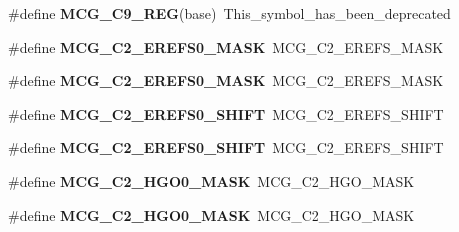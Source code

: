 \begin{DoxyCompactItemize}
\item 
\#define {\bfseries M\+C\+G\+\_\+\+C9\+\_\+\+R\+EG}(base)~This\+\_\+symbol\+\_\+has\+\_\+been\+\_\+deprecated\hypertarget{group__Backward__Compatibility__Symbols_ga4edaa0cc446f810f9aa01a41f6960573}{}\label{group__Backward__Compatibility__Symbols_ga4edaa0cc446f810f9aa01a41f6960573}

\item 
\#define {\bfseries M\+C\+G\+\_\+\+C2\+\_\+\+E\+R\+E\+F\+S0\+\_\+\+M\+A\+SK}~M\+C\+G\+\_\+\+C2\+\_\+\+E\+R\+E\+F\+S\+\_\+\+M\+A\+SK\hypertarget{group__Backward__Compatibility__Symbols_gae9a32b79976c185a9b6567cc74b2d5af}{}\label{group__Backward__Compatibility__Symbols_gae9a32b79976c185a9b6567cc74b2d5af}

\item 
\#define {\bfseries M\+C\+G\+\_\+\+C2\+\_\+\+E\+R\+E\+F\+S0\+\_\+\+M\+A\+SK}~M\+C\+G\+\_\+\+C2\+\_\+\+E\+R\+E\+F\+S\+\_\+\+M\+A\+SK\hypertarget{group__Backward__Compatibility__Symbols_gae9a32b79976c185a9b6567cc74b2d5af}{}\label{group__Backward__Compatibility__Symbols_gae9a32b79976c185a9b6567cc74b2d5af}

\item 
\#define {\bfseries M\+C\+G\+\_\+\+C2\+\_\+\+E\+R\+E\+F\+S0\+\_\+\+S\+H\+I\+FT}~M\+C\+G\+\_\+\+C2\+\_\+\+E\+R\+E\+F\+S\+\_\+\+S\+H\+I\+FT\hypertarget{group__Backward__Compatibility__Symbols_ga1cea960436deb685a7f131203e4898b5}{}\label{group__Backward__Compatibility__Symbols_ga1cea960436deb685a7f131203e4898b5}

\item 
\#define {\bfseries M\+C\+G\+\_\+\+C2\+\_\+\+E\+R\+E\+F\+S0\+\_\+\+S\+H\+I\+FT}~M\+C\+G\+\_\+\+C2\+\_\+\+E\+R\+E\+F\+S\+\_\+\+S\+H\+I\+FT\hypertarget{group__Backward__Compatibility__Symbols_ga1cea960436deb685a7f131203e4898b5}{}\label{group__Backward__Compatibility__Symbols_ga1cea960436deb685a7f131203e4898b5}

\item 
\#define {\bfseries M\+C\+G\+\_\+\+C2\+\_\+\+H\+G\+O0\+\_\+\+M\+A\+SK}~M\+C\+G\+\_\+\+C2\+\_\+\+H\+G\+O\+\_\+\+M\+A\+SK\hypertarget{group__Backward__Compatibility__Symbols_ga58de06b4d4514888ca2e7cbc68e50ccc}{}\label{group__Backward__Compatibility__Symbols_ga58de06b4d4514888ca2e7cbc68e50ccc}

\item 
\#define {\bfseries M\+C\+G\+\_\+\+C2\+\_\+\+H\+G\+O0\+\_\+\+M\+A\+SK}~M\+C\+G\+\_\+\+C2\+\_\+\+H\+G\+O\+\_\+\+M\+A\+SK\hypertarget{group__Backward__Compatibility__Symbols_ga58de06b4d4514888ca2e7cbc68e50ccc}{}\label{group__Backward__Compatibility__Symbols_ga58de06b4d4514888ca2e7cbc68e50ccc}


\end{DoxyCompactItemize}
